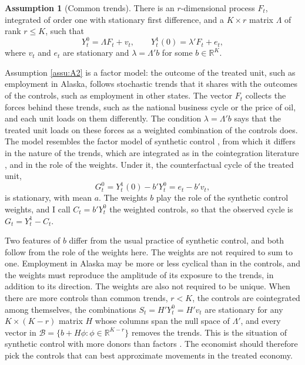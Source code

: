 \documentclass[12pt,a4paper]{article}
\theoremstyle{definition}
\newtheorem{assumption}{Assumption}
\theoremstyle{definition}\newtheorem{example}{Example}
\theoremstyle{definition}\newtheorem{definition}{Definition}
\begin{document}
\begin{assumption}[Common trends\label{assu:A2}]
There is an $r$-dimensional process $F_t$, integrated of order one with stationary first difference, and a $K\times r$ matrix $\Lambda$ of rank $r\leq K$, such that
\begin{equation}
Y^0_t=\Lambda F_t+v_t,\qquad Y^1_t(0)=\lambda'F_t+e_t,
\label{eq:factors}
\end{equation}
where $v_t$ and $e_t$ are stationary and $\lambda=\Lambda'b$ for some $b\in\mathbb{R}^K$.
\end{assumption}

Assumption \ref{assu:A2} is a factor model: the outcome of the treated unit, such as employment in Alaska, follows stochastic trends that it shares with the outcomes of the controls, such as employment in other states. The vector $F_t$ collects the forces behind these trends, such as the national business cycle or the price of oil, and each unit loads on them differently. The condition $\lambda=\Lambda'b$ says that the treated unit loads on these forces as a weighted combination of the controls does. The model resembles the factor model of synthetic control \citep{Abadie2010}, from which it differs in the nature of the trends, which are integrated as in the cointegration literature \citep{EngleGranger1987}, and in the role of the weights. Under it, the counterfactual cycle of the treated unit,
\begin{equation}
G^0_t=Y^1_t(0)-b'Y^0_t=e_t-b'v_t,
\label{eq:cycle0}
\end{equation}
is stationary, with mean $a$. The weights $b$ play the role of the synthetic control weights, and I call $C_t=b'Y^0_t$ the weighted controls, so that the observed cycle is $G_t=Y^1_t-C_t$.

Two features of $b$ differ from the usual practice of synthetic control, and both follow from the role of the weights here. The weights are not required to sum to one. Employment in Alaska may be more or less cyclical than in the controls, and the weights must reproduce the amplitude of its exposure to the trends, in addition to its direction. The weights are also not required to be unique. When there are more controls than common trends, $r<K$, the controls are cointegrated among themselves, the combinations $S_t=H'Y^0_t=H'v_t$ are stationary for any $K\times(K-r)$ matrix $H$ whose columns span the null space of $\Lambda'$, and every vector in $\mathcal{B}=\{b+H\phi:\phi\in\mathbb{R}^{K-r}\}$ removes the trends. This is the situation of synthetic control with more donors than factors \citep{AbadieLHour2021}. The economist should therefore pick the controls that can best approximate movements in the treated economy.
\end{document}
